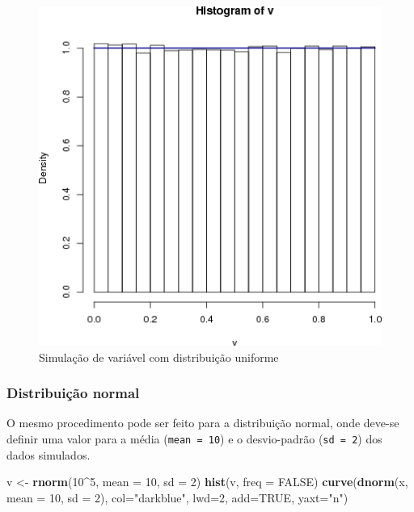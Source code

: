 \documentclass[a4paper]{article}
\newenvironment{Shaded}{\begin{snugshade}}{\end{snugshade}}
\newcommand{\KeywordTok}[1]{\textcolor[rgb]{0.13,0.29,0.53}{\textbf{#1}}}
\newcommand{\DataTypeTok}[1]{\textcolor[rgb]{0.13,0.29,0.53}{#1}}
\newcommand{\DecValTok}[1]{\textcolor[rgb]{0.00,0.00,0.81}{#1}}
\newcommand{\StringTok}[1]{\textcolor[rgb]{0.31,0.60,0.02}{#1}}
\newcommand{\OtherTok}[1]{\textcolor[rgb]{0.56,0.35,0.01}{#1}}
\newcommand{\OperatorTok}[1]{\textcolor[rgb]{0.81,0.36,0.00}{\textbf{#1}}}
\newcommand{\NormalTok}[1]{#1}
\begin{document}
\begin{figure}[H]

{\centering \includegraphics[width=0.7\linewidth]{images/runif-1} 

}

\caption{Simulação de variável com distribuição uniforme}\label{fig:runif}
\end{figure}

\subsubsection{Distribuição normal}\label{distribuicao-normal}

O mesmo procedimento pode ser feito para a distribuição normal, onde
deve-se definir uma valor para a média (\texttt{mean\ =\ 10}) e o
desvio-padrão (\texttt{sd\ =\ 2}) dos dados simulados.

\begin{Shaded}
\begin{Highlighting}[]
\NormalTok{v <-}\StringTok{ }\KeywordTok{rnorm}\NormalTok{(}\DecValTok{10}\OperatorTok{^}\DecValTok{5}\NormalTok{, }\DataTypeTok{mean =} \DecValTok{10}\NormalTok{, }\DataTypeTok{sd =} \DecValTok{2}\NormalTok{)}
\KeywordTok{hist}\NormalTok{(v, }\DataTypeTok{freq =} \OtherTok{FALSE}\NormalTok{)}
\KeywordTok{curve}\NormalTok{(}\KeywordTok{dnorm}\NormalTok{(x, }\DataTypeTok{mean =} \DecValTok{10}\NormalTok{, }\DataTypeTok{sd =} \DecValTok{2}\NormalTok{), }
          \DataTypeTok{col=}\StringTok{"darkblue"}\NormalTok{, }\DataTypeTok{lwd=}\DecValTok{2}\NormalTok{, }\DataTypeTok{add=}\OtherTok{TRUE}\NormalTok{, }\DataTypeTok{yaxt=}\StringTok{"n"}\NormalTok{)}
\end{Highlighting}
\end{Shaded}
\end{document}
